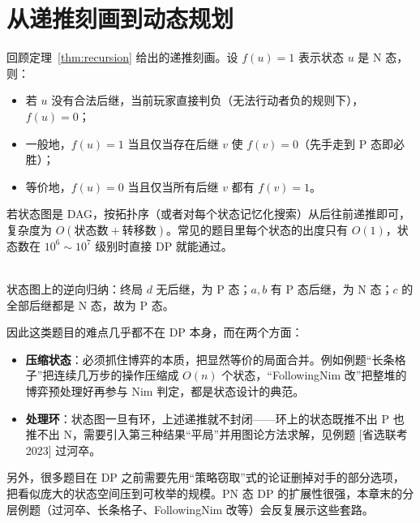 \section{从递推刻画到动态规划}
回顾定理~\ref{thm:recursion} 给出的递推刻画。设 $f(u)=1$ 表示状态 $u$ 是 N 态，则：
\begin{itemize}
\item 若 $u$ 没有合法后继，当前玩家直接判负（无法行动者负的规则下），$f(u)=0$；
\item 一般地，$f(u)=1$ 当且仅当存在后继 $v$ 使 $f(v)=0$（先手走到 P 态即必胜）；
\item 等价地，$f(u)=0$ 当且仅当所有后继 $v$ 都有 $f(v)=1$。
\end{itemize}
若状态图是 DAG，按拓扑序（或者对每个状态记忆化搜索）从后往前递推即可，复杂度为 $O(\text{状态数}+\text{转移数})$。常见的题目里每个状态的出度只有 $O(1)$，状态数在 $10^6\sim10^7$ 级别时直接 DP 就能通过。

\begin{center}
\\[2pt]
{\small 状态图上的逆向归纳：终局 $d$ 无后继，为 P 态；$a,b$ 有 P 态后继，为 N 态；$c$ 的全部后继都是 N 态，故为 P 态。}
\end{center}

因此这类题目的难点几乎都不在 DP 本身，而在两个方面：
\begin{itemize}
\item \textbf{压缩状态}：必须抓住博弈的本质，把显然等价的局面合并。例如例题“长条格子”把连续几万步的操作压缩成 $O(n)$ 个状态，“FollowingNim 改”把整堆的博弈预处理好再参与 Nim 判定，都是状态设计的典范。
\item \textbf{处理环}：状态图一旦有环，上述递推就不封闭——环上的状态既推不出 P 也推不出 N，需要引入第三种结果“平局”并用图论方法求解，见例题 [省选联考 2023] 过河卒。
\end{itemize}

另外，很多题目在 DP 之前需要先用“策略窃取”式的论证删掉对手的部分选项，把看似庞大的状态空间压到可枚举的规模。PN 态 DP 的扩展性很强，本章末的分层例题（过河卒、长条格子、FollowingNim 改等）会反复展示这些套路。

